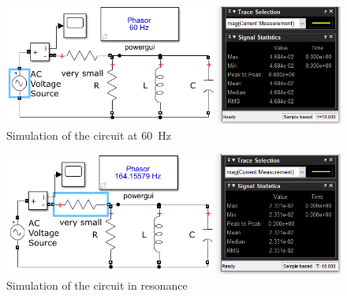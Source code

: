 \documentclass{article}
\begin{document}
\newpage

\begin{figure}[H]
    \centering
        \includegraphics[width=\textwidth]{ECE2101L_Lab10_B2_60.png}
        \caption{Simulation of the circuit at \SI{60}{\hertz}}
\end{figure}

\begin{figure}[H]
    \centering
        \includegraphics[width=\textwidth]{ECE2101L_Lab10_B2_f0.png}
        \caption{Simulation of the circuit in resonance}
\end{figure}
\end{document}
